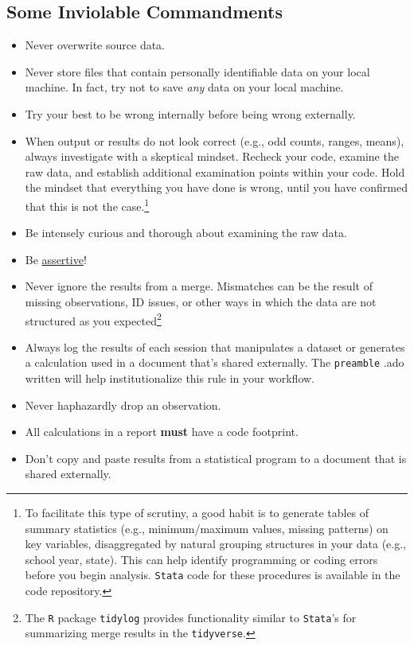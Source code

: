 \subsection{Some Inviolable Commandments}
\begin{itemize}
	\item Never overwrite source data.
	\item Never store files that contain personally identifiable data on your local machine. In fact, try not to save \emph{any} data on your local machine.
	\item Try your best to be wrong internally before being wrong externally.
	\item When output or results do not look correct (e.g., odd counts, ranges, means), always investigate with a skeptical mindset. Recheck your code, examine the raw data, and establish additional examination points within your code. Hold the mindset that everything you have done is wrong, until you have confirmed that this is not the case.\footnote{To facilitate this type of scrutiny, a good habit is to generate tables of summary statistics (e.g., minimum/maximum values, missing patterns) on key variables, disaggregated by natural grouping structures in your data (e.g., school year, state). This can help identify programming or coding errors before you begin analysis. \texttt{Stata} code for these procedures is available in the code repository.}
	\item Be intensely curious and thorough about examining the raw data.
	\item Be \href{https://journals.sagepub.com/doi/pdf/10.1177/1536867X0400300414}{assertive}!
	\item Never ignore the results from a merge. Mismatches can be the result of missing observations, ID issues, or other ways in which the data are not structured as you expected\footnote{The \texttt{R} package \texttt{tidylog} provides functionality similar to \texttt{Stata}'s for summarizing merge results in the \texttt{tidyverse}.}
	\item Always log the results of each session that manipulates a dataset or generates a calculation used in a document that's shared externally. The \texttt{preamble} .ado written will help institutionalize this rule in your workflow.
	\item Never haphazardly drop an observation.
	\item All calculations in a report \textbf{must} have a code footprint.
	\item Don't copy and paste results from a statistical program to a document that is shared externally.

\end{itemize}
